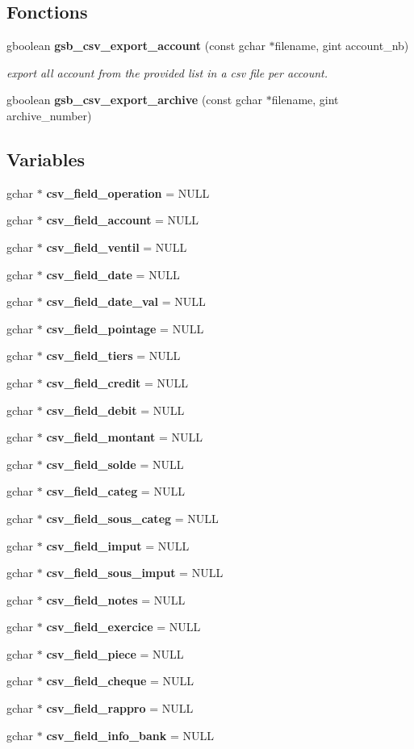 \subsection*{Fonctions}
\begin{DoxyCompactItemize}
\item 
gboolean {\bf gsb\_\-csv\_\-export\_\-account} (const gchar $\ast$filename, gint account\_\-nb)
\begin{DoxyCompactList}\small\item\em export all account from the provided list in a csv file per account. \item\end{DoxyCompactList}\item 
gboolean {\bf gsb\_\-csv\_\-export\_\-archive} (const gchar $\ast$filename, gint archive\_\-number)
\end{DoxyCompactItemize}
\subsection*{Variables}
\begin{DoxyCompactItemize}
\item 
gchar $\ast$ {\bf csv\_\-field\_\-operation} = NULL
\item 
gchar $\ast$ {\bf csv\_\-field\_\-account} = NULL
\item 
gchar $\ast$ {\bf csv\_\-field\_\-ventil} = NULL
\item 
gchar $\ast$ {\bf csv\_\-field\_\-date} = NULL
\item 
gchar $\ast$ {\bf csv\_\-field\_\-date\_\-val} = NULL
\item 
gchar $\ast$ {\bf csv\_\-field\_\-pointage} = NULL
\item 
gchar $\ast$ {\bf csv\_\-field\_\-tiers} = NULL
\item 
gchar $\ast$ {\bf csv\_\-field\_\-credit} = NULL
\item 
gchar $\ast$ {\bf csv\_\-field\_\-debit} = NULL
\item 
gchar $\ast$ {\bf csv\_\-field\_\-montant} = NULL
\item 
gchar $\ast$ {\bf csv\_\-field\_\-solde} = NULL
\item 
gchar $\ast$ {\bf csv\_\-field\_\-categ} = NULL
\item 
gchar $\ast$ {\bf csv\_\-field\_\-sous\_\-categ} = NULL
\item 
gchar $\ast$ {\bf csv\_\-field\_\-imput} = NULL
\item 
gchar $\ast$ {\bf csv\_\-field\_\-sous\_\-imput} = NULL
\item 
gchar $\ast$ {\bf csv\_\-field\_\-notes} = NULL
\item 
gchar $\ast$ {\bf csv\_\-field\_\-exercice} = NULL
\item 
gchar $\ast$ {\bf csv\_\-field\_\-piece} = NULL
\item 
gchar $\ast$ {\bf csv\_\-field\_\-cheque} = NULL
\item 
gchar $\ast$ {\bf csv\_\-field\_\-rappro} = NULL
\item 
gchar $\ast$ {\bf csv\_\-field\_\-info\_\-bank} = NULL
\end{DoxyCompactItemize}


